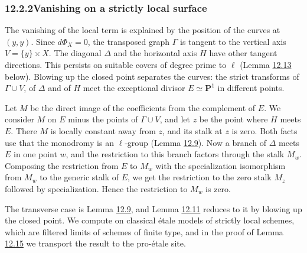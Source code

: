 \documentclass[11pt]{article}
\begin{document}
\subsubsection*{\texorpdfstring{12.2.2\quad Vanishing on a strictly local surface}{12.2.2 Vanishing on a strictly local surface}}
\label{bp249}%
\label{bp250}%
The vanishing of the local term is explained by the position of the curves at \((y,y)\). Since \(d\Phi_X=0\), the transposed graph \(\Gamma\) is tangent to the vertical axis \(V=\{y\}\times X\). The diagonal \(\Delta\) and the horizontal axis \(H\) have other tangent directions. This persists on suitable covers of degree prime to \(\ell\) (Lemma \hyperref[bp265]{12.13} below). Blowing up the closed point separates the curves: the strict transforms of \(\Gamma\cup V\), of \(\Delta\) and of \(H\) meet the exceptional divisor \(E\simeq\mathbf P^1\) in different points.

Let \(M\) be the direct image of the coefficients from the complement of \(E\). We consider \(M\) on \(E\) minus the points of \(\Gamma\cup V\), and let \(z\) be the point where \(H\) meets \(E\). There \(M\) is locally constant away from \(z\), and its stalk at \(z\) is zero. Both facts use that the monodromy is an \(\ell\)-group (Lemma \hyperref[bp253]{12.9}). Now a branch of \(\Delta\) meets \(E\) in one point \(w\), and the restriction to this branch factors through the stalk \(M_w\). Composing the restriction from \(E\) to \(M_w\) with the specialization isomorphism from \(M_w\) to the generic stalk of \(E\), we get the restriction to the zero stalk \(M_z\) followed by specialization. Hence the restriction to \(M_w\) is zero.

The transverse case is Lemma \hyperref[bp253]{12.9}, and Lemma \hyperref[bp259]{12.11} reduces to it by blowing up the closed point. We compute on classical étale models of strictly local schemes, which are filtered limits of schemes of finite type, and in the proof of Lemma \hyperref[bp270]{12.15} we transport the result to the pro-étale site.
\end{document}
